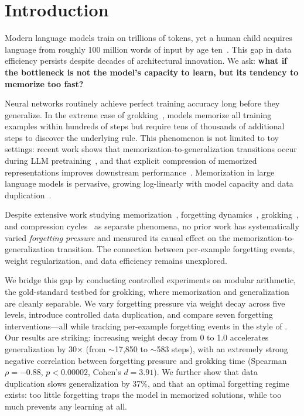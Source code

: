 \section{Introduction}
\label{sec:intro}

Modern language models train on trillions of tokens, yet a human child acquires language from roughly 100 million words of input by age ten~\cite{feldman2020does}. This gap in data efficiency persists despite decades of architectural innovation. We ask: {\bf what if the bottleneck is not the model's capacity to learn, but its tendency to memorize too fast?}

Neural networks routinely achieve perfect training accuracy long before they generalize. In the extreme case of grokking~\cite{power2022grokking}, models memorize all training examples within hundreds of steps but require tens of thousands of additional steps to discover the underlying rule. This phenomenon is not limited to toy settings: recent work shows that memorization-to-generalization transitions occur during LLM pretraining~\cite{li2025grokking}, and that explicit compression of memorized representations improves downstream performance~\cite{yu2025memorization}. Memorization in large language models is pervasive, growing log-linearly with model capacity and data duplication~\cite{carlini2023quantifying}.

Despite extensive work studying memorization~\cite{carlini2023quantifying, zhang2023counterfactual}, forgetting dynamics~\cite{toneva2019empirical}, grokking~\cite{power2022grokking}, and compression cycles~\cite{yu2025memorization} as separate phenomena, no prior work has systematically varied \emph{forgetting pressure} and measured its causal effect on the memorization-to-generalization transition. The connection between per-example forgetting events, weight regularization, and data efficiency remains unexplored.

We bridge this gap by conducting controlled experiments on modular arithmetic, the gold-standard testbed for grokking, where memorization and generalization are cleanly separable. We vary forgetting pressure via weight decay across five levels, introduce controlled data duplication, and compare seven forgetting interventions---all while tracking per-example forgetting events in the style of \citet{toneva2019empirical}. Our results are striking: increasing weight decay from 0 to 1.0 accelerates generalization by 30$\times$ (from ${\sim}$17,850 to ${\sim}$583 steps), with an extremely strong negative correlation between forgetting pressure and grokking time (Spearman $\rho = -0.88$, $p < 0.00002$, Cohen's $d = 3.91$). We further show that data duplication slows generalization by 37\%, and that an optimal forgetting regime exists: too little forgetting traps the model in memorized solutions, while too much prevents any learning at all.

